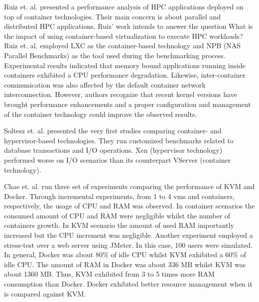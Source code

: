 Ruiz et. al. \cite{ruiz2015performance} presented a performance analysis of HPC applications deployed on top of container technologies.
Their main concern is about parallel and distributed HPC applications. 
Ruiz' work intends to answer the question What is the impact of using container-based virtualization to execute HPC workloads?
Ruiz et. al. employed LXC as the container-based technology and 
NPB (NAS Parallel Benchmarks) as the tool used during the benchmarking process.
Experimental results indicated that memory bound applications running inside containers exhibited a CPU performance degradation.
Likewise, inter-container communication was also affected by the default container network interconnection. 
However, authors recognize that recent kernel versions have brought performance enhancements and a proper configuration and management of the container technology could improve the observed results.

Soltesz et. al. \cite{soltesz2007container} presented the very first studies comparing container- and hypervisor-based technologies. 
They run customized benchmarks related to database transactions and I/O operations. 
Xen (hypervisor technology) performed worse on I/O scenarios than its counterpart VServer (container technology). 

Chae et. al. \cite{chae2019performance} run three set of experiments comparing the performance of KVM and Docker. 
Through incremental experiments, from 1 to 4 vms and containers, respectively, the usage of CPU and RAM was observed.
In container scenarios the consumed amount of CPU and RAM were negligible whilst the number of containers growth.
In KVM scenario the amount of used RAM importantly increased but the CPU increment was negligible.  
Another experiment employed a stress-test over a web server using JMeter.
In this case, 100 users were simulated.
In general, Docker was about 80\% of idle CPU whilst KVM exhibited a 60\% of idle CPU.
The amount of RAM in Docker was about 336 MB whilst KVM was about 1360 MB.
Thus, KVM exhibited from 3 to 5 times more RAM consumption than Docker. 
Docker exhibited better resource management when it is compared against KVM. 

